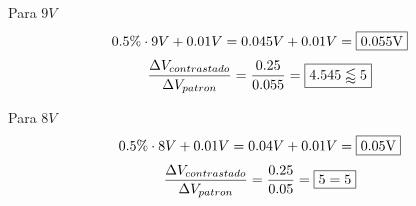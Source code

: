 Para $9V$
$$0.5\% \cdot 9V + 0.01V = 0.045V + 0.01V = \framebox{0.055V}$$
$$\dfrac{\Delta V_{contrastado}}{\Delta V_{patron}} = \dfrac{0.25}{0.055} = \framebox{$4.545 \lessapprox 5$}$$

Para $8V$
$$0.5\% \cdot 8V + 0.01V = 0.04V + 0.01V = \framebox{0.05V}$$
$$\dfrac{\Delta V_{contrastado}}{\Delta V_{patron}} = \dfrac{0.25}{0.05} = \framebox{$5 = 5$}$$
